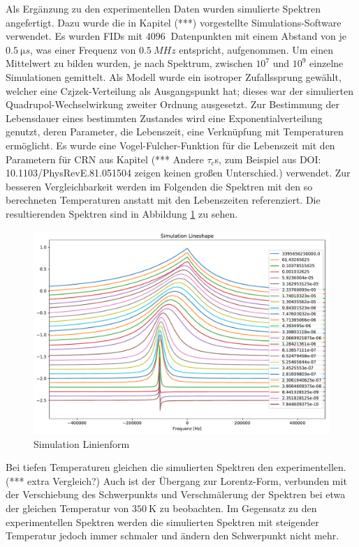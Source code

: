 Als Ergänzung zu den experimentellen Daten wurden simulierte Spektren angefertigt. Dazu wurde die in Kapitel (***) vorgestellte Simulations-Software verwendet. Es wurden FIDs mit $\SI{4096}{}$ Datenpunkten mit einem Abstand von je $\SI{0.5}{\micro s}$, was einer Frequenz von $\SI{0.5}{MHz}$ entspricht, aufgenommen. Um einen Mittelwert zu bilden wurden, je nach Spektrum, zwischen $10^{7}$ und $10^{9}$ einzelne Simulationen gemittelt. Als Modell wurde ein isotroper Zufallssprung gewählt, welcher eine Czjzek-Verteilung als Ausgangspunkt hat; dieses war der simulierten Quadrupol-Wechselwirkung zweiter Ordnung ausgesetzt. Zur Bestimmung der Lebensdauer eines bestimmten Zustandes wird eine Exponentialverteilung genutzt, deren Parameter, die Lebenszeit, eine Verknüpfung mit Temperaturen ermöglicht. Es wurde eine Vogel-Fulcher-Funktion für die Lebenszeit mit den Parametern für CRN aus Kapitel (*** Andere $\tau_c$s, zum Beispiel aus DOI: 10.1103/PhysRevE.81.051504 zeigen keinen großen Unterschied.) verwendet. Zur besseren Vergleichbarkeit werden im Folgenden die Spektren mit den so berechneten Temperaturen anstatt mit den Lebenszeiten referenziert. Die resultierenden Spektren sind in Abbildung \ref{fig:res:sim_linienform} zu sehen.
\begin{figure}
	\begin{center}
		\includegraphics[width=\textwidth]{graphics/plots/SIM/sim_lineshape.pdf}
	\end{center}
	\caption{Simulation Linienform} \label{fig:res:sim_linienform}
\end{figure}
Bei tiefen Temperaturen gleichen die simulierten Spektren den experimentellen. (*** extra Vergleich?) Auch ist der Übergang zur Lorentz-Form, verbunden mit der Verschiebung des Schwerpunkts und Verschmälerung der Spektren bei etwa der gleichen Temperatur von $\SI{350}{\kelvin}$ zu beobachten. Im Gegensatz zu den experimentellen Spektren werden die simulierten Spektren mit steigender Temperatur jedoch immer schmaler und ändern den Schwerpunkt nicht mehr.


